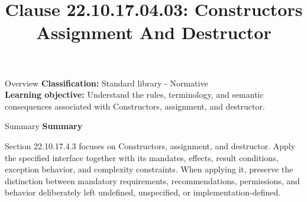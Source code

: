 \documentclass[10pt,letterpaper]{article}
\title{Clause 22.10.17.04.03: Constructors Assignment And Destructor}
\author{}
\date{}
\begin{document}
\maketitle
\begin{CornellOverviewBox}{Overview}
\textbf{Classification:} Standard library - Normative\\[2pt]
\textbf{Learning objective:} Understand the rules, terminology, and semantic consequences associated with Constructors, assignment, and destructor.
\end{CornellOverviewBox}\begin{CornellSummaryBox}{Summary}
{\sffamily\bfseries\color{Accent} Summary}\par\vspace{3pt}Section 22.10.17.4.3 focuses on Constructors, assignment, and destructor. Apply the specified interface together with its mandates, effects, result conditions, exception behavior, and complexity constraints. When applying it, preserve the distinction between mandatory requirements, recommendations, permissions, and behavior deliberately left undefined, unspecified, or implementation-defined.
\end{CornellSummaryBox}
\end{document}

